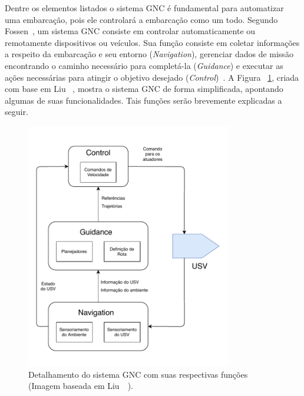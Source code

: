         Dentre os elementos listados o sistema GNC é fundamental para automatizar uma embarcação, pois ele controlará a embarcação como um todo. Segundo Fossen~\cite{Fossen2011Handbook}, um sistema GNC consiste em controlar automaticamente ou remotamente dispositivos ou veículos. Sua função consiste em coletar informações a respeito da embarcação e seu entorno (\textit{Navigation}), gerenciar dados de missão encontrando o caminho necessário para completá-la (\textit{Guidance}) e executar as ações necessárias para atingir o objetivo desejado (\textit{Control})~\cite{Liu2016Unmanned}. A Figura ~\ref{fig:Liu2016_gncSystem}, criada com base em Liu \etal~\cite{Liu2016Unmanned}, mostra o sistema GNC de forma simplificada, apontando algumas de suas funcionalidades. Tais funções serão brevemente explicadas a seguir.
        
        \begin{figure}
            \centering
            \includegraphics[width=0.8\textwidth]{fig/chap2/sistema_gnc_liu.pdf}
            \caption{Detalhamento do sistema GNC com suas respectivas funções (Imagem baseada em Liu~\etal~\cite{Liu2016Unmanned}).}
            \label{fig:Liu2016_gncSystem}
        \end{figure}
        
